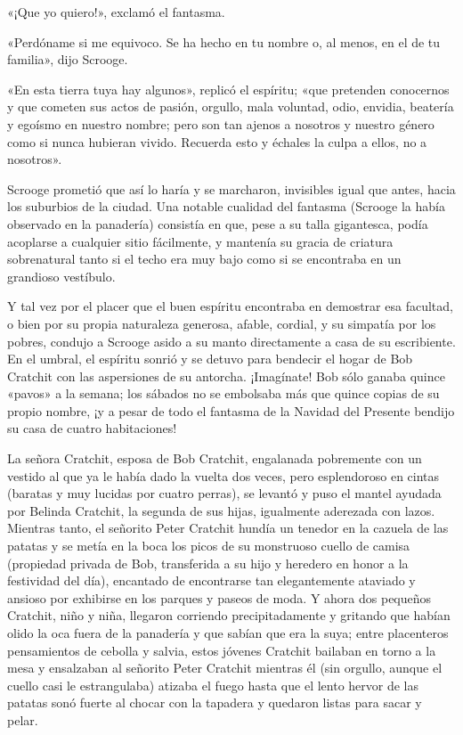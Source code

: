 \documentclass{novela}
\begin{document}
 «¡Que yo quiero!», exclamó el fantasma.

 «Perdóname si me equivoco. Se ha hecho en tu nombre o, al menos, en el de tu familia», dijo Scrooge.

 «En esta tierra tuya hay algunos», replicó el espíritu; «que pretenden conocernos y que cometen sus actos de pasión, orgullo, mala voluntad, odio, envidia, beatería y egoísmo en nuestro nombre; pero son tan ajenos a nosotros y nuestro género como si nunca hubieran vivido. Recuerda esto y échales la culpa a ellos, no a nosotros».

 Scrooge prometió que así lo haría y se marcharon, invisibles igual que antes, hacia los suburbios de la ciudad. Una notable cualidad del fantasma (Scrooge la había observado en la panadería) consistía en que, pese a su talla gigantesca, podía acoplarse a cualquier sitio fácilmente, y mantenía su gracia de criatura sobrenatural tanto si el techo era muy bajo como si se encontraba en un grandioso vestíbulo.

 Y tal vez por el placer que el buen espíritu encontraba en demostrar esa facultad, o bien por su propia naturaleza generosa, afable, cordial, y su simpatía por los pobres, condujo a Scrooge asido a su manto directamente a casa de su escribiente. En el umbral, el espíritu sonrió y se detuvo para bendecir el hogar de Bob Cratchit con las aspersiones de su antorcha. ¡Imagínate! Bob sólo ganaba quince «pavos» a la semana; los sábados no se embolsaba más que quince copias de su propio nombre, ¡y a pesar de todo el fantasma de la Navidad del Presente bendijo su casa de cuatro habitaciones!

 La señora Cratchit, esposa de Bob Cratchit, engalanada pobremente con un vestido al que ya le había dado la vuelta dos veces, pero esplendoroso en cintas (baratas y muy lucidas por cuatro perras), se levantó y puso el mantel ayudada por Belinda Cratchit, la segunda de sus hijas, igualmente aderezada con lazos. Mientras tanto, el señorito Peter Cratchit hundía un tenedor en la cazuela de las patatas y se metía en la boca los picos de su monstruoso cuello de camisa (propiedad privada de Bob, transferida a su hijo y heredero en honor a la festividad del día), encantado de encontrarse tan elegantemente ataviado y ansioso por exhibirse en los parques y paseos de moda. Y ahora dos pequeños Cratchit, niño y niña, llegaron corriendo precipitadamente y gritando que habían olido la oca fuera de la panadería y que sabían que era la suya; entre placenteros pensamientos de cebolla y salvia, estos jóvenes Cratchit bailaban en torno a la mesa y ensalzaban al señorito Peter Cratchit mientras él (sin orgullo, aunque el cuello casi le estrangulaba) atizaba el fuego hasta que el lento hervor de las patatas sonó fuerte al chocar con la tapadera y quedaron listas para sacar y pelar.
\end{document}
